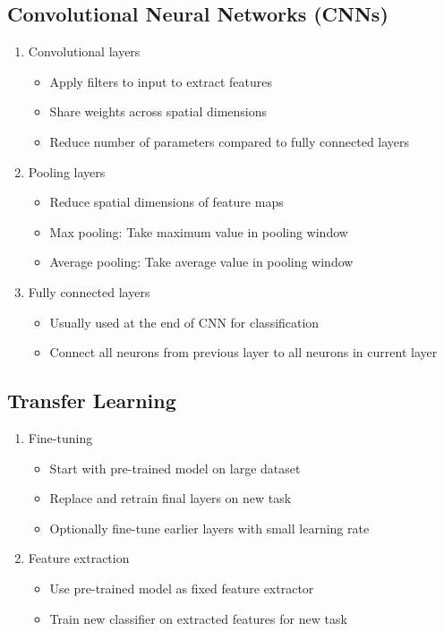 \documentclass{article}
\begin{document}
\subsection{Convolutional Neural Networks (CNNs)}
\begin{enumerate}
    \item Convolutional layers
    \begin{itemize}
        \item Apply filters to input to extract features
        \item Share weights across spatial dimensions
        \item Reduce number of parameters compared to fully connected layers
    \end{itemize}
    
    \item Pooling layers
    \begin{itemize}
        \item Reduce spatial dimensions of feature maps
        \item Max pooling: Take maximum value in pooling window
        \item Average pooling: Take average value in pooling window
    \end{itemize}
    
    \item Fully connected layers
    \begin{itemize}
        \item Usually used at the end of CNN for classification
        \item Connect all neurons from previous layer to all neurons in current layer
    \end{itemize}
\end{enumerate}

\subsection{Transfer Learning}
\begin{enumerate}
    \item Fine-tuning
    \begin{itemize}
        \item Start with pre-trained model on large dataset
        \item Replace and retrain final layers on new task
        \item Optionally fine-tune earlier layers with small learning rate
    \end{itemize}
    
    \item Feature extraction
    \begin{itemize}
        \item Use pre-trained model as fixed feature extractor
        \item Train new classifier on extracted features for new task
    \end{itemize}
\end{enumerate}
\end{document}
